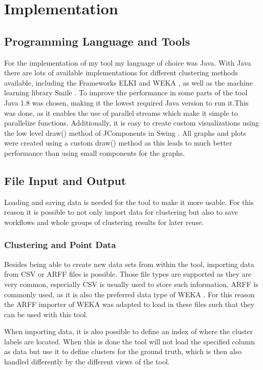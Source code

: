 \documentclass[
	a4paper,
	english,
	twoside,
	openright,               
	11pt                            
	]{report}
\begin{document}
\chapter{Implementation}\label{cha:impl}
\section{Programming Language and Tools}
For the implementation of my tool my language of choice was Java. With Java there are lots of available implementations for different clustering methods available, including the Frameworks ELKI \cite{10.1007/978-3-540-69497-7_41} and WEKA \cite{10.1145/1656274.1656278}, as well as the machine learning library Smile \cite{javasmile}. To improve the performance in some parts of the tool Java 1.8 was chosen, making it the lowest required Java version to run it.This was done, as it enables the use of parallel streams which make it simple to parallelize functions. Additionally, it is easy to create custom visualizations using the low level draw() method of JComponents in Swing \cite{javaswing}. All graphs and plots were created using a custom draw() method as this leads to much better performance than using small components for the graphs.

\section{File Input and Output}
Loading and saving data is needed for the tool to make it more usable. For this reason it is possible to not only import data for clustering but also to save workflows and whole groups of clustering results for later reuse.
\subsection{Clustering and Point Data}
Besides being able to create new data sets from within the tool, importing data from CSV or ARFF files is possible. Those file types are supported as they are very common, especially CSV is usually used to store such information. ARFF is commonly used, as it is also the preferred data type of WEKA \cite{10.1145/1656274.1656278}. For this reason the ARFF importer of WEKA was adapted to load in these files such that they can be used with this tool. 

When importing data, it is also possible to define an index of where the cluster labels are located. When this is done the tool will not load the specified column as data but use it to define clusters for the ground truth, which is then also handled differently by the different views of the tool.
\end{document}
